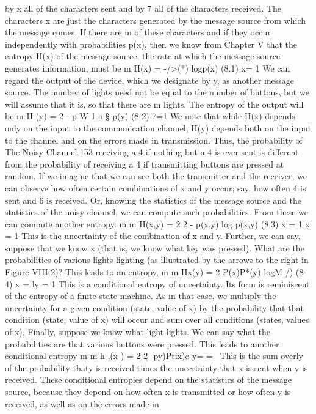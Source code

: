 {{{by x all of the characters sent and by 7 all of the characters received.
The characters x are just the characters generated by the message
source from which the message comes. If there are m of these
characters and if they occur independently with probabilities p(x),
then we know from Chapter V that the entropy H(x) of the message
source, the rate at which the message source generates information,
must be m
H(x) = -/>(*) logp(x) (8.1)
x= 1
We can regard the output of the device, which we designate by
y, as another message source. The number of lights need not be
equal to the number of buttons, but we will assume that it is, so
that there are m lights. The entropy of the output will be
m
H (y) = 2 - p W 1 o § p(y) (8-2)
7=1
We note that while H(x) depends only on the input to the communication
channel, H(y) depends both on the input to the channel
and on the errors made in transmission. Thus, the probability of
The Noisy Channel
153
receiving a 4 if nothing but a 4 is ever sent is different from the
probability of receiving a 4 if transmitting buttons are pressed
at random.
If we imagine that we can see both the transmitter and the
receiver, we can observe how often certain combinations of x and
y occur; say, how often 4 is sent and 6 is received. Or, knowing
the statistics of the message source and the statistics of the noisy
channel, we can compute such probabilities. From these we can
compute another entropy.
m m
H(x,y) = 2 2 - p(x,y) log p(x,y) (8.3)
x = 1 x = 1
This is the uncertainty of the combination of x and y.
Further, we can say, suppose that we know x (that is, we know
what key was pressed). What are the probabilities of various lights
lighting (as illustrated by the arrows to the right in Figure VIII-2)?
This leads to an entropy,
m m
Hx(y) = 2 P(x)P*(y) logM /) (8-4)
x = ly = 1
This is a conditional entropy of uncertainty. Its form is reminiscent
of the entropy of a finite-state machine. As in that case, we
multiply the uncertainty for a given condition (state, value of x)
by the probability that that condition (state, value of x) will occur
and sum over all conditions (states, values of x).
Finally, suppose we know what light lights. We can say what the
probabilities are that various buttons were pressed. This leads to
another conditional entropy
m m
h ,(x ) = 2 2 -p{y)Ptix)\o%
y= \x = \
This is the sum overly of the probability thaty is received times
the uncertainty that x is sent when y is received.
These conditional entropies depend on the statistics of the
message source, because they depend on how often x is transmitted
or how often y is received, as well as on the errors made in
}}}}
